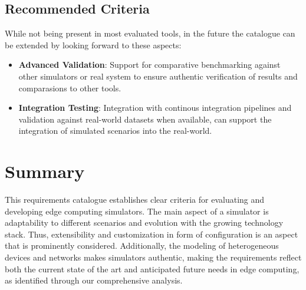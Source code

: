 \subsection{Recommended Criteria}
While not being present in most evaluated tools, in the future the catalogue can be extended by looking forward to these aspects:
\begin{itemize}
  \item \textbf{Advanced Validation}:
        Support for comparative benchmarking against other simulators or real system to ensure authentic verification of results and comparasions to other tools.
  \item \textbf{Integration Testing}:
        Integration with continous integration pipelines and validation against real-world datasets when available, can support the integration of simulated scenarios into the real-world.
\end{itemize}
\section{Summary}
This requirements catalogue establishes clear criteria for evaluating and developing edge computing simulators.
The main aspect of a simulator is adaptability to different scenarios and evolution with the growing technology stack.
Thus, extensibility and customization in form of configuration is an aspect that is prominently considered.
Additionally, the modeling of heterogeneous devices and networks makes simulators authentic, making the requirements reflect both the current state of the art and anticipated future needs in edge computing, as identified through our comprehensive analysis.
